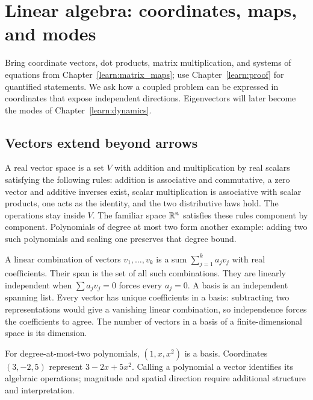 \chapter{Linear algebra: coordinates, maps, and modes}
\label{learn:linear_algebra}



Bring coordinate vectors, dot products, matrix multiplication, and systems
of equations from Chapter~\ref{learn:matrix_maps}; use Chapter~\ref{learn:proof} for quantified statements.
We ask how a coupled problem can be expressed in coordinates that expose
independent directions. Eigenvectors will later become the modes of
Chapter~\ref{learn:dynamics}.



\section{Vectors extend beyond arrows}
A real vector space is a set $V$ with addition and multiplication by real
scalars satisfying the following rules: addition is associative and
commutative, a zero vector and additive inverses exist, scalar multiplication
is associative with scalar products, one acts as the identity, and the two
distributive laws hold. The operations stay inside $V$.
The familiar space $\mathbb{R}^n$ satisfies these rules component by component.
Polynomials of degree at most two form another example: adding two such
polynomials and scaling one preserves that degree bound.

A linear combination of vectors $v_1,\ldots,v_k$ is a sum
$\sum_{j=1}^k a_jv_j$ with real coefficients. Their span is the set of all
such combinations. They are linearly independent when
$\sum a_jv_j=0$ forces every $a_j=0$. A basis is an independent spanning
list. Every vector has unique coefficients in a basis: subtracting two
representations would give a vanishing linear combination, so independence
forces the coefficients to agree. The number of vectors in a basis of a
finite-dimensional space is its dimension.

For degree-at-most-two polynomials, $(1,x,x^2)$ is a basis. Coordinates
$(3,-2,5)$ represent $3-2x+5x^2$. Calling a polynomial a vector identifies
its algebraic operations; magnitude and spatial direction require additional
structure and interpretation.

